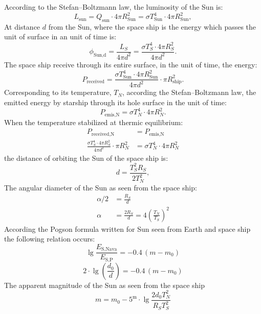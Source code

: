 According to the Stefan--Boltzmann law, the luminosity of the Sun is:
\begin{equation*}
L_{\text{sun}} = Q_{\text{sun}} \cdot 4\pi R_{\text{Sun}}^2
  = \sigma T_{\text{Sun}}^4 \cdot 4\pi R_{\text{Sun}}^2, \tag{1}
\end{equation*}
At distance $d$ from the Sun, where the space ship is the energy which passes
the unit of surface in an unit of time is:
\begin{equation*}
\phi_{\text{Sun,d}} = \frac{L_S}{4\pi d^2}
  = \frac{\sigma T_S^4 \cdot 4\pi R_S^2}{4\pi d^2}. \tag{2}
\end{equation*}
The space ship receive through its entire surface, in the unit of time, the
energy:
\[
P_{\text{received}} = \frac{\sigma T_{\text{Sun}}^4 \cdot 4\pi R_{\text{Sun}}^2}{4\pi d^2}
  \cdot \pi R_{\text{ship}}^2.
\]
Corresponding to its temperature, $T_N$, according the Stefan--Boltzmann law,
the emitted energy by starship through its hole surface %
in the unit of time:
\[
P_{\text{emis,N}} = \sigma T_N^4 \cdot 4\pi R_N^2.
\]
When the temperature stabilized at thermic equilibrium:
\begin{align*}
P_{\text{received,N}} &= P_{\text{emis,N}}\\
\frac{\sigma T_S^4 \cdot 4\pi R_S^2}{4\pi d^2} \cdot \pi R_N^2
  &= \sigma T_N^4 \cdot 4\pi R_N^2
\end{align*}
the distance of orbiting the Sun of the space ship is:
\[
d = \frac{T_S^2 R_S}{2 T_N^2},
\]
The angular diameter of the Sun as seen from the space ship:
\begin{align*}
\alpha/2 &= \frac{R_S}{d}\\
\alpha &= \frac{2 R_S}{d} = 4 \left( \frac{T_N}{T_S} \right)^{\!2}
\end{align*}
According the Pogson formula written for Sun seen from Earth and space ship
the following relation occurs:
\begin{equation*}
\lg \frac{E_{\text{S,Nava}}}{E_{\text{S,P}}} = -0.4\,(m - m_0) \tag{2}
\end{equation*}
\[
2 \cdot \lg\!\left( \frac{d_0}{d} \right) = -0.4\,(m - m_0)
\]
The apparent magnitude of the Sun as seen from the space ship
\[
m = m_0 - 5^{\mathrm{m}} \cdot \lg \frac{2 d_0 T_N^2}{R_S T_S^2}
\]

